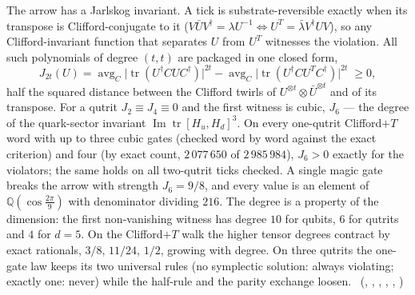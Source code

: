 The arrow has a Jarlskog invariant. A tick is substrate-reversible exactly when its transpose is Clifford-conjugate
to it ($V\bar UV^\dagger=\lambda U^{-1}\Leftrightarrow U^T=\bar\lambda V^\dagger UV$), so any Clifford-invariant function that
separates $U$ from $U^T$ witnesses the violation. All such polynomials of degree $(t,t)$ are packaged in one closed form,
\[
J_{2t}(U)=\mathop{\mathrm{avg}}_{C}\bigl|\operatorname{tr}(U^\dagger CUC^\dagger)\bigr|^{2t}-\mathop{\mathrm{avg}}_{C}\bigl|\operatorname{tr}(U^\dagger CU^TC^\dagger)\bigr|^{2t}\;\ge0 ,
\]
half the squared distance between the Clifford twirls of $U^{\otimes t}\otimes\bar U^{\otimes t}$ and of its transpose. For a qutrit
$J_2\equiv J_4\equiv0$ and the first witness is cubic, $J_6$ --- the degree of the quark-sector invariant
$\operatorname{Im}\operatorname{tr}[H_u,H_d]^3$. On every one-qutrit Clifford$+T$ word with up to three cubic gates (checked word by word
against the exact criterion) and four (by exact count, $2\,077\,650$ of $2\,985\,984$), $J_6>0$ exactly for the violators;
the same holds on all two-qutrit ticks checked. A single magic gate breaks the arrow with strength $J_6=9/8$, and every
value is an element of $\mathbb Q(\cos\frac{2\pi}{9})$ with denominator dividing $216$. The degree is a property of the
dimension: the first non-vanishing witness has degree $10$ for qubits, $6$ for qutrits and $4$ for $d=5$. On the
Clifford$+T$ walk the higher tensor degrees contract by exact rationals, $3/8$, $11/24$, $1/2$, growing with degree. On
three qutrits the one-gate law keeps its two universal rules (no symplectic solution: always violating; exactly one:
never) while the half-rule and the parity exchange loosen. \tierC\ (,
, ,
, ,
)

